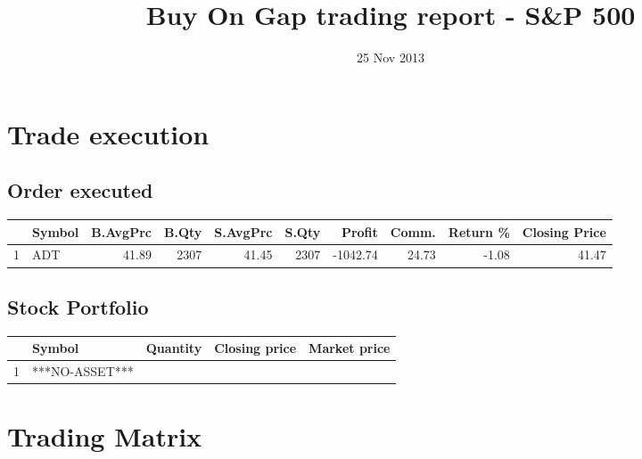 \documentclass{tufte-handout}\usepackage[]{graphicx}\usepackage[]{color}
\title{Buy On Gap trading report - S\&P 500}
\date{ 25 Nov 2013 }
\begin{document}
\maketitle


\section{Trade execution}
\subsection{Order executed}

\begin{table}[ht]
\centering
\begin{tabular}{llrrrrrrr|r}
  \hline
 & Symbol & B.AvgPrc & B.Qty & S.AvgPrc & S.Qty & Profit & Comm. & Return \% & Closing Price \\ 
  \hline
1 & ADT & 41.89 & 2307 & 41.45 & 2307 & -1042.74 & 24.73 & -1.08 & 41.47 \\ 
   \hline
\end{tabular}
\end{table}



\subsection{Stock Portfolio}
\begin{table}[ht]
\centering
\begin{tabular}{llrrr}
  \hline
 & Symbol & Quantity & Closing price & Market price \\ 
  \hline
1 & ***NO-ASSET*** &  &  &  \\ 
   \hline
\end{tabular}
\end{table}



\section{Trading Matrix}
\end{document}
